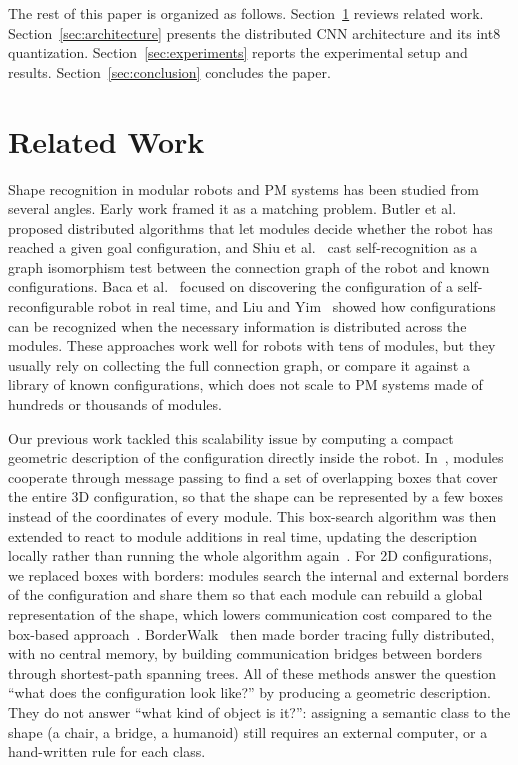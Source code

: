 \documentclass[12pt]{article}
\begin{document}
The rest of this paper is organized as follows. Section~\ref{sec:related_work} reviews related work. Section~\ref{sec:architecture} presents the distributed CNN architecture and its int8 quantization. Section~\ref{sec:experiments} reports the experimental setup and results. Section~\ref{sec:conclusion} concludes the paper.

\section{Related Work}
\label{sec:related_work}

Shape recognition in modular robots and PM systems has been studied from several angles. Early work framed it as a matching problem. Butler et al.~\cite{butler2002goal} proposed distributed algorithms that let modules decide whether the robot has reached a given goal configuration, and Shiu et al.~\cite{shiu2010graph} cast self-recognition as a graph isomorphism test between the connection graph of the robot and known configurations. Baca et al.~\cite{baca2015configuration} focused on discovering the configuration of a self-reconfigurable robot in real time, and Liu and Yim~\cite{liu2020configuration} showed how configurations can be recognized when the necessary information is distributed across the modules. These approaches work well for robots with tens of modules, but they usually rely on collecting the full connection graph, or compare it against a library of known configurations, which does not scale to PM systems made of hundreds or thousands of modules.

Our previous work tackled this scalability issue by computing a compact geometric description of the configuration directly inside the robot. In~\cite{bassil2023shape}, modules cooperate through message passing to find a set of overlapping boxes that cover the entire 3D configuration, so that the shape can be represented by a few boxes instead of the coordinates of every module. This box-search algorithm was then extended to react to module additions in real time, updating the description locally rather than running the whole algorithm again~\cite{bassil2025dynamic}. For 2D configurations, we replaced boxes with borders: modules search the internal and external borders of the configuration and share them so that each module can rebuild a global representation of the shape, which lowers communication cost compared to the box-based approach~\cite{bassil2025configuration}. BorderWalk~\cite{bassil2026borderwalk} then made border tracing fully distributed, with no central memory, by building communication bridges between borders through shortest-path spanning trees. All of these methods answer the question ``what does the configuration look like?'' by producing a geometric description. They do not answer ``what kind of object is it?'': assigning a semantic class to the shape (a chair, a bridge, a humanoid) still requires an external computer, or a hand-written rule for each class.
\end{document}
